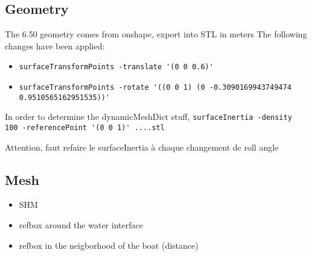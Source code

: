 


\subsection{Geometry}

    The 6.50 geometry comes from onshape, export into STL in meters 
    The following changes have been applied:

    \begin{itemize}
        \item \verb|surfaceTransformPoints -translate '(0 0 0.6)'|
        \item \verb|surfaceTransformPoints -rotate '((0 0 1) (0 -0.3090169943749474 0.9510565162951535))'|
    \end{itemize}

    In order to determine the dynamicMeshDict stuff, \verb|surfaceInertia -density 100 -referencePoint '(0 0 1)' ....stl|


    Attention, faut refaire le surfaceInertia à chaque changement de roll angle 

\subsection{Mesh}
    \begin{itemize}
        \item SHM
        \item refbox around the water interface 
        \item refbox in the neigborhood of the boat (distance) 
    \end{itemize}

